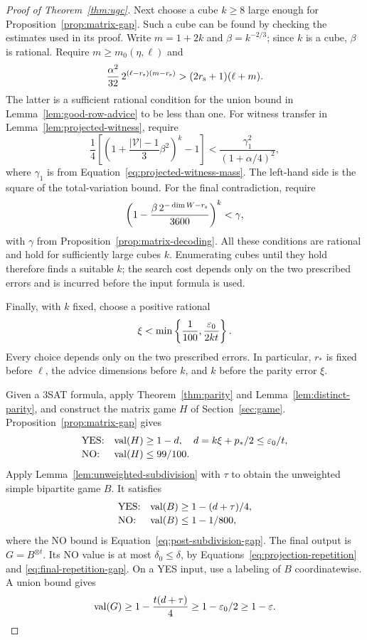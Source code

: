\begin{proof}[Proof of Theorem~\ref{thm:ugc}]
Next choose a cube $k\ge8$ large enough for
Proposition~\ref{prop:matrix-gap}.
Such a cube can be found by checking the estimates used in its proof.
Write $m=1+2k$ and $\beta=k^{-2/3}$; since $k$ is a cube, $\beta$ is
rational.  Require $m\ge m_0(\eta,\ell)$ and
\[
 \frac{\alpha^2}{32}\,2^{(\ell-r_{\rm s})(m-r_{\rm s})}
 >(2r_{\rm s}+1)(\ell+m).
\]
The latter is a sufficient rational condition for the union bound in
Lemma~\ref{lem:good-row-advice} to be less than one.  For witness
transfer in Lemma~\ref{lem:projected-witness}, require
\[
 \frac14\left[
 \left(1+\frac{|\mathcal V|-1}{3}\beta^2\right)^k-1\right]
 <\frac{\gamma_1^2}{(1+\alpha/4)^2},
\]
where $\gamma_1$ is from
Equation~\eqref{eq:projected-witness-mass}.  The left-hand side is the
square of the total-variation bound.  For the final contradiction,
require
\[
 \left(1-\frac{\beta\,2^{-\dim W-r_{\rm s}}}{3600}\right)^k
 <\gamma,
\]
with $\gamma$ from Proposition~\ref{prop:matrix-decoding}.  All these
conditions are rational and hold for sufficiently large cubes $k$.
Enumerating cubes until they hold therefore finds a suitable $k$;
the search cost depends only on the two prescribed errors and is
incurred before the input formula is used.

Finally, with $k$ fixed, choose a positive rational
\begin{equation}
 \xi<\min\left\{\frac1{100},\frac{\varepsilon_0}{2kt}\right\}.
 \label{eq:final-parity-error}
\end{equation}
Every choice depends only on the two prescribed errors.  In
particular, $r_*$ is fixed before $\ell$, the advice dimensions before
$k$, and $k$ before the parity error $\xi$.

Given a 3SAT formula, apply Theorem~\ref{thm:parity} and
Lemma~\ref{lem:distinct-parity}, and construct the matrix game $H$
of Section~\ref{sec:game}.  Proposition~\ref{prop:matrix-gap} gives
\[
 \begin{array}{ll}
 \text{YES:}&\operatorname{val}(H)\ge1-d,
       \quad d=k\xi+p_*/2\le\varepsilon_0/t,\\[2pt]
 \text{NO:}&\operatorname{val}(H)\le99/100.
 \end{array}
\]
Apply Lemma~\ref{lem:unweighted-subdivision} with $\tau$ to obtain
the unweighted simple bipartite game $B$.  It satisfies
\[
 \begin{array}{ll}
 \text{YES:}&\operatorname{val}(B)\ge1-(d+\tau)/4,\\[2pt]
 \text{NO:}&\operatorname{val}(B)\le1-1/800,
 \end{array}
\]
where the NO bound is Equation~\eqref{eq:post-subdivision-gap}.
The final output is $G=B^{\otimes t}$.  Its NO value is at most
$\delta_0\le\delta$, by Equations~\eqref{eq:projection-repetition}
and \eqref{eq:final-repetition-gap}.  On a YES input, use a labeling
of $B$ coordinatewise.  A union bound gives
\[
 \operatorname{val}(G)\ge1-\frac{t(d+\tau)}4
 \ge1-\varepsilon_0/2\ge1-\varepsilon.
\]


\end{proof}
